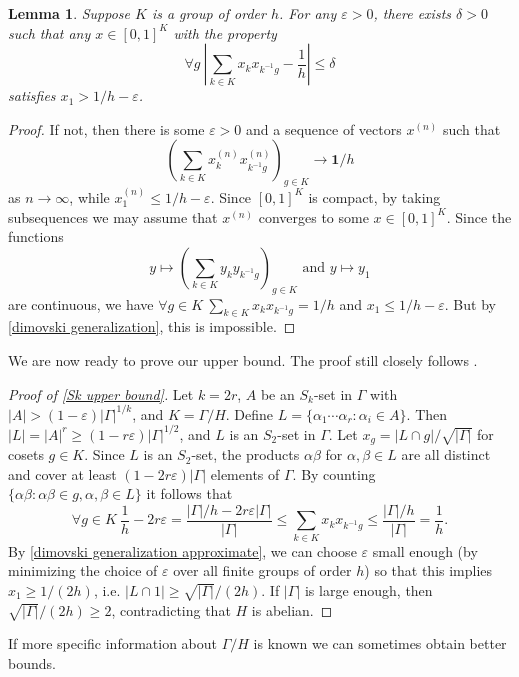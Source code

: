 \documentclass[12pt]{article}
\newtheorem{lemma}{Lemma}
\begin{document}
\begin{lemma} \label{dimovski generalization approximate}
    Suppose $K$ is a group of order $h$. For any $\varepsilon>0$, there exists $\delta>0$ such that any $x\in[0,1]^K$ with the property
    $$\forall g\ \left|\sum_{k\in K}x_kx_{k^{-1}g}-\frac{1}{h}\right|\le\delta$$
    satisfies $x_1>1/h-\varepsilon$.
\end{lemma}
\begin{proof}
    If not, then there is some $\varepsilon>0$ and a sequence of vectors $x^{(n)}$ such that
    $$\left(\sum_{k\in K}x^{(n)}_kx^{(n)}_{k^{-1}g}\right)_{g\in K}\to\mathbf 1/h$$
    as $n\to\infty$, while $x^{(n)}_1\le 1/h-\varepsilon$. Since $[0,1]^K$ is compact, by taking subsequences we may assume that $x^{(n)}$ converges to some $x\in[0,1]^K$. Since the functions
    $$y\mapsto\left(\sum_{k\in K}y_ky_{k^{-1}g}\right)_{g\in K}\text{ and }y\mapsto y_1$$
    are continuous, we have $\forall g\in K\ \sum_{k\in K}x_kx_{k^{-1}g}=1/h$ and $x_1\le 1/h-\varepsilon$. But by \autoref{dimovski generalization}, this is impossible.
\end{proof}

We are now ready to prove our upper bound. The proof still closely follows \cite{dimovski1992groups}.

\begin{proof}[Proof of \autoref{Sk upper bound}]
    Let $k=2r$, $A$ be an $S_k$-set in $\Gamma$ with $|A|>(1-\varepsilon)|\Gamma|^{1/k}$, and $K=\Gamma/H$. Define $L=\{\alpha_1\cdots\alpha_r:\alpha_i\in A\}$. Then $|L|=|A|^r\ge(1-r\varepsilon)|\Gamma|^{1/2}$, and $L$ is an $S_2$-set in $\Gamma$. Let $x_g=|L\cap g|/\sqrt{|\Gamma|}$ for cosets $g\in K$. Since $L$ is an $S_2$-set, the products $\alpha\beta$ for $\alpha,\beta\in L$ are all distinct and cover at least $(1-2r\varepsilon)|\Gamma|$ elements of $\Gamma$. By counting $\{\alpha\beta:\alpha\beta\in g,\alpha,\beta\in L\}$ it follows that
    $$\forall g\in K\ \frac{1}{h}-2r\varepsilon=\frac{|\Gamma|/h-2r\varepsilon|\Gamma|}{|\Gamma|}\le\sum_{k\in K}x_kx_{k^{-1}g}\le\frac{|\Gamma|/h}{|\Gamma|}=\frac{1}{h}.$$
    By \autoref{dimovski generalization approximate}, we can choose $\varepsilon$ small enough (by minimizing the choice of $\varepsilon$ over all finite groups of order $h$) so that this implies $x_1\ge1/(2h)$, i.e. $|L\cap 1|\ge\sqrt{|\Gamma|}/(2h)$. If $|\Gamma|$ is large enough, then $\sqrt{|\Gamma|}/(2h)\ge 2$, contradicting that $H$ is abelian.
\end{proof}

If more specific information about $\Gamma/H$ is known we can sometimes obtain better bounds.
\end{document}
